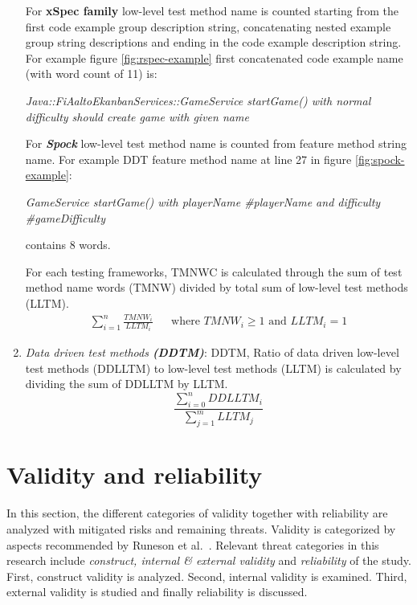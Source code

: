 \begin{addmargin}[0em]{0em}
\begin{enumerate}
    For \textbf{xSpec family} low-level test method name is counted starting from the first code example group description string,
    concatenating nested example group string descriptions and ending in the code example description string.
    For example figure \ref{fig:rspec-example} first concatenated code example name (with word count of 11) is:

    \begin{center}
    \textit{Java::FiAaltoEkanbanServices::GameService startGame() with normal difficulty should create game with given name}
    \end{center}

    For \textbf{\textit{Spock}} low-level test method name is counted from feature method string name. For example DDT feature method name at
    line 27 in figure \ref{fig:spock-example}:
    \begin{center}
    \textit{GameService startGame() with playerName \#playerName and difficulty \#gameDifficulty}
    \end{center}
    contains 8 words.

    For each testing frameworks, TMNWC is calculated through the sum of test method name words (TMNW) divided by total sum of low-level test methods (LLTM).
    \begin{align*}
        \sum_{i=1}^{n}\frac{TMNW_{i}}{LLTM_{i}} && \text {where } TMNW_{i} \geq 1 \text{ and } LLTM_{i} = 1
    \end{align*}

    \item \textit{Data driven test methods \textbf{(DDTM)}}:
    DDTM, Ratio of data driven low-level test methods (DDLLTM) to low-level test methods (LLTM) is calculated by dividing the sum
    of DDLLTM by LLTM.
    \[\frac{\sum_{i=0}^{n}DDLLTM_{i}}{\sum_{j=1}^{m}LLTM_{j}}\]
    \end{enumerate}
    \end{addmargin}

\section{Validity and reliability}
In this section, the different categories of validity together with reliability are analyzed with mitigated risks and remaining
threats.
Validity is categorized by aspects recommended by Runeson et al.~\cite{runeson2012case}. Relevant threat categories in
this research include \textit{construct, internal \& external validity} and \textit{reliability} of the study.
First, construct validity is analyzed. Second, internal validity is examined. Third, external validity is studied and
finally reliability is discussed.


